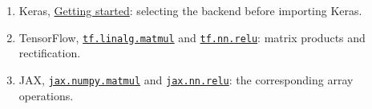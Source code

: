 \begin{enumerate}
\item Keras, \href{https://keras.io/getting_started/}{Getting started}: selecting the backend before importing Keras.
\item TensorFlow, \href{https://www.tensorflow.org/api_docs/python/tf/linalg/matmul}{\texttt{tf.linalg.matmul}} and \href{https://www.tensorflow.org/api_docs/python/tf/nn/relu}{\texttt{tf.nn.relu}}: matrix products and rectification.
\item JAX, \href{https://docs.jax.dev/en/latest/_autosummary/jax.numpy.matmul.html}{\texttt{jax.numpy.matmul}} and \href{https://docs.jax.dev/en/latest/_autosummary/jax.nn.relu.html}{\texttt{jax.nn.relu}}: the corresponding array operations.
\end{enumerate}
\par\endgroup
